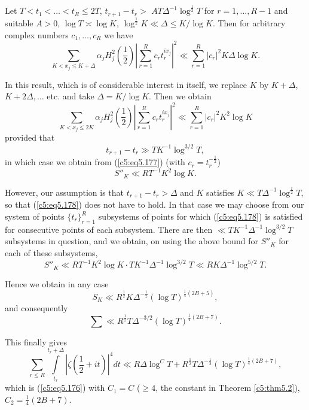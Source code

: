 \begin{lemma}\label{c5:lem5.2} 
Let $T < t_1 < \ldots < t_R \leq 2T$, $t_{r+1} - t_r >$ $AT\Delta^{-1}
\log^{\frac{1}{2}} T$ for $r =1, \ldots, R-1$ and suitable $A > 0$,
$\log T \asymp \log K$, $\log^{\frac{1}{2}} K \ll \Delta \leq K/\log
K$. Then for arbitrary complex numbers $c_1, \ldots, c_R$ we have  
$$ 
\sum\limits_{K <x_j \leq K + \Delta} \alpha_j H^2_j \left(\frac{1}{2}
\right) \left|\sum\limits_{r=1}^R c_r t^{i x_j}_r \right|^2  \ll
\sum\limits^R_{r=1} |c_r|^2 K \Delta \log K. 
$$

In this result, which is of considerable interest in itself, we
replace $K$ by $K+\Delta$, $K + 2\Delta, \ldots$ etc. and take $\Delta
= K / \log K$. Then we obtain 
\begin{equation}
\sum\limits_{K < x_j \leq 2K} \alpha_j H^2_j \left(\frac{1}{2} \right)
\left| \sum\limits^R_{r=1} c_r t^{ix_j}_r\right|^2 \ll
\sum\limits^R_{r=1} |c_r|^2 K^2 \log K\label{c5:eq5.177} 
\end{equation}
provided that
\begin{equation}
t_{r+1} - t_r \gg TK^{-1} \log^{3/2} T,\label{c5:eq5.178}
\end{equation}
in which case we obtain from (\ref{c5:eq5.177}) (with $c_r =
t^{-\frac{1}{2}}_r$) 
$$
S''_K \ll RT^{-1} K^2 \log K.
$$

However, our assumption is that $t_{r+1} - t_r > \Delta$ and $K$
satisfies $K \ll T \Delta^{-1} \log^{\frac{1}{2}} T$, so that
(\ref{c5:eq5.178}) does not have to hold. In that case we may choose
from our system of points $\{t_r\}^R_{r=1}$ subsystems of points for
which (\ref{c5:eq5.178}) is satisfied for consecutive points of each
subsystem. There are then $\ll TK^{-1}\Delta^{-1} \log^{3/2} T$
subsystems in question, and we obtain, on using the above bound for
$S''_K$ for each of these subsystems, 
$$
S''_K \ll RT^{-1} K^2 \log K \cdot TK^{-1} \Delta^{-1} \log^{3/2} T
\ll RK \Delta^{-1} \log^{5/2} T.  
$$\pageoriginale

Hence we obtain in any case
$$
S_K \ll R^{\frac{1}{2}} K \Delta^{-\frac{1}{2}} (\log T)^{\frac{1}{4}
  (2B+5)},  
$$
and consequently
$$
\sum\ll R^{\frac{1}{2}} T \Delta^{-3/2} (\log T)^{\frac{1}{4} (2B +7)}. 
$$

This finally gives
$$
\sum\limits_{r \leq R}  \int\limits^{t_r + \Delta}_{t_r} \left| \zeta
\left(\frac{1}{2} + it \right)\right|^4 dt \ll R \Delta \log^C T +
R^{\frac{1}{2}} T \Delta^{-\frac{1}{2}} (\log T)^{\frac{1}{4} (2B+7)}, 
$$
which is (\ref{c5:eq5.176}) with $C_1 = C$ ($\geq 4$, the constant in
Theorem \ref{c5:thm5.2}), $C_2 = \frac{1}{4} (2B + 7)$. 
\end{lemma}

